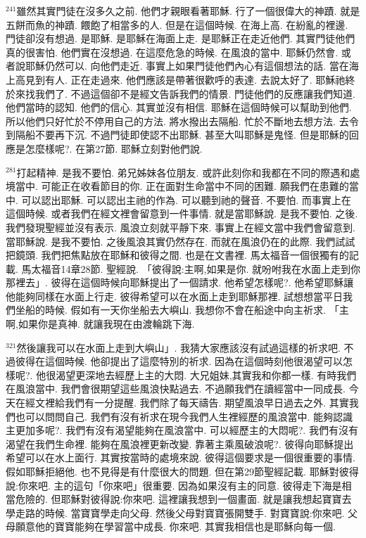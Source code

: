 \documentclass{book}
\begin{document}
$^{241}$雖然其實門徒在沒多久之前.
他們才親眼看著耶穌.
行了一個很偉大的神蹟.
就是五餅而魚的神蹟.
餵飽了相當多的人.
但是在這個時候.
在海上高.
在紛亂的裡邊.
門徒卻沒有想過.
是耶穌.
是耶穌在海面上走.
是耶穌正在走近他們.
其實門徒他們真的很害怕.
他們實在沒想過.
在這麼危急的時候.
在風浪的當中.
耶穌仍然會.
或者說耶穌仍然可以.
向他們走近.
事實上如果門徒他們內心有這個想法的話.
當在海上高見到有人.
正在走過來.
他們應該是帶著很歡呼的表達.
去說太好了.
耶穌祂終於來找我們了.
不過這個卻不是經文告訴我們的情景.
門徒他們的反應讓我們知道.
他們當時的認知.
他們的信心.
其實並沒有相信.
耶穌在這個時候可以幫助到他們.
所以他們只好忙於不停用自己的方法.
將水撥出去隔船.
忙於不斷地去想方法.
去令到隔船不要再下沉.
不過門徒即使認不出耶穌.
甚至大叫耶穌是鬼怪.
但是耶穌的回應是怎麼樣呢?.
在第27節.
耶穌立刻對他們說.

$^{281}$打起精神.
是我不要怕.
弟兄姊妹各位朋友.
或許此刻你和我都在不同的際遇和處境當中.
可能正在收看節目的你.
正在面對生命當中不同的困難.
願我們在患難的當中.
可以認出耶穌.
可以認出主祂的作為.
可以聽到祂的聲音.
不要怕.
而事實上在這個時候.
或者我們在經文裡會留意到一件事情.
就是當耶穌說.
是我不要怕.
之後.
我們發現聖經並沒有表示.
風浪立刻就平靜下來.
事實上在經文當中我們會留意到.
當耶穌說.
是我不要怕.
之後風浪其實仍然存在.
而就在風浪仍在的此際.
我們試試把鏡頭.
我們把焦點放在耶穌和彼得之間.
也是在文書裡.
馬太福音一個很獨有的記載.
馬太福音14章28節.
聖經說.
「彼得說:主啊,如果是你.
就吩咐我在水面上走到你那裡去」.
彼得在這個時候向耶穌提出了一個請求.
他希望怎樣呢?.
他希望耶穌讓他能夠同樣在水面上行走.
彼得希望可以在水面上走到耶穌那裡.
試想想當平日我們坐船的時候.
假如有一天你坐船去大嶼山.
我想你不會在船途中向主祈求.
「主啊,如果你是真神.
就讓我現在由渡輪跳下海.

$^{321}$然後讓我可以在水面上走到大嶼山」.
我猜大家應該沒有試過這樣的祈求吧.
不過彼得在這個時候.
他卻提出了這麼特別的祈求.
因為在這個時刻他很渴望可以怎樣呢?.
他很渴望更深地去經歷上主的大悶.
大兄姐妹,其實我和你都一樣.
有時我們在風浪當中.
我們會很期望這些風浪快點過去.
不過願我們在讀經當中一同成長.
今天在經文裡給我們有一分提醒.
我們除了每天禱告.
期望風浪早日過去之外.
其實我們也可以問問自己.
我們有沒有祈求在現今我們人生裡經歷的風浪當中.
能夠認識主更加多呢?.
我們有沒有渴望能夠在風浪當中.
可以經歷主的大悶呢?.
我們有沒有渴望在我們生命裡.
能夠在風浪裡更新改變.
靠著主乘風破浪呢?.
彼得向耶穌提出希望可以在水上面行.
其實按當時的處境來說.
彼得這個要求是一個很重要的事情.
假如耶穌拒絕他.
也不見得是有什麼很大的問題.
但在第29節聖經記載.
耶穌對彼得說:你來吧.
主的這句「你來吧」很重要.
因為如果沒有主的同意.
彼得走下海是相當危險的.
但耶穌對彼得說:你來吧.
這裡讓我想到一個畫面.
就是讓我想起寶寶去學走路的時候.
當寶寶學走向父母.
然後父母對寶寶張開雙手.
對寶寶說:你來吧.
父母願意他的寶寶能夠在學習當中成長.
你來吧.
其實我相信也是耶穌向每一個.
\end{document}
